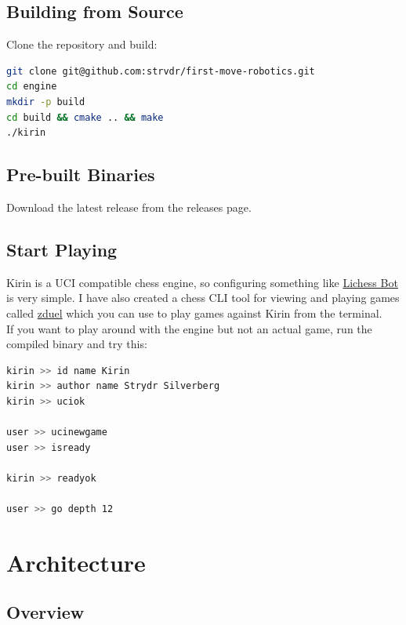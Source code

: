 \documentclass[11pt,a4paper]{report}
\begin{document}
\section{Building from Source}

Clone the repository and build:

\begin{lstlisting}[language=bash]
git clone git@github.com:strvdr/first-move-robotics.git
cd engine
mkdir -p build
cd build && cmake .. && make
./kirin
\end{lstlisting}

\section{Pre-built Binaries}

Download the latest release from the releases page.

\section{Start Playing}
Kirin is a UCI compatible chess engine, so configuring something like \href{https://github.com/lichess-bot-devs/lichess-bot}{Lichess Bot} is very simple. I have also created a chess CLI tool for viewing and playing games called \href{https://github.com/strvdr/zduel}{zduel} which you can use to play games against Kirin from the terminal.\\

If you want to play around with the engine but not an actual game, run the compiled binary and try this:
\begin{lstlisting}[language=bash]
kirin >> id name Kirin
kirin >> author name Strydr Silverberg
kirin >> uciok

user >> ucinewgame
user >> isready

kirin >> readyok

user >> go depth 12
\end{lstlisting}

\chapter{Architecture}

\section{Overview}
\end{document}
